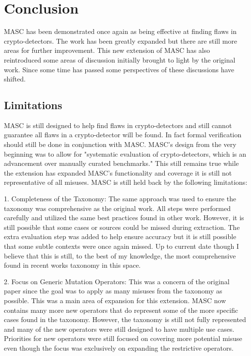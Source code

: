 \chapter{Conclusion}
\label{chap_conclusion}

MASC has been demonstrated once again as being effective at finding flaws in crypto-detectors. The work has been greatly expanded but there are still more areas for further improvement. This new extension of MASC has also reintroduced some areas of discussion initially brought to light by the original work. Since some time has passed some perspectives of these discussions have shifted.

\section{Limitations}
\label{ch6:sec:limitations}

MASC is still designed to help find flaws in crypto-detectors and still cannot guarantee all flaws in a crypto-detector will be found. In fact formal verification should still be done in conjunction with MASC. MASC's design from the very beginning was to allow for "systematic evaluation of crypto-detectors, which is an advancement over manually curated benchmarks." This still remains true while the extension has expanded MASC's functionality and coverage it is still not representative of all misuses. MASC is still held back by the following limitations:

1. Completeness of the Taxonomy: The same approach was used to ensure the taxonomy was comprehensive as the original work. All steps were performed carefully and utilized the same best practices found in other work. However, it is still possible that some cases or sources could be missed during extraction. The extra evaluation step was added to help ensure accuracy but it is still possible that some subtle contexts were once again missed. Up to current date though I believe that this is still, to the best of my knowledge, the most comprehensive found in recent works taxonomy in this space.

2. Focus on Generic Mutation Operators: This was a concern of the original paper since the goal was to apply as many misuses from the taxonomy as possible. This was a main area of expansion for this extension. MASC now contains many more new operators that do represent some of the more specific cases found in the taxonomy. However, the taxonomy is still not fully represented and many of the new operators were still designed to have multiple use cases. Priorities for new operators were still focused on covering more potential misuse even though the focus was exclusively on expanding the restrictive operators.

